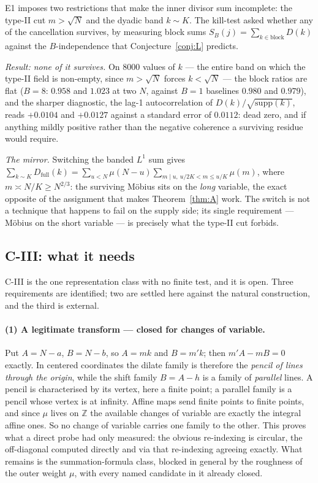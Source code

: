 \documentclass[11pt,a4paper]{article}
\theoremstyle{plain}
\theoremstyle{definition}
\begin{document}
E1 imposes two restrictions that make the inner divisor sum
incomplete: the type-II cut $m > \sqrt N$ and the dyadic band
$k \sim K$. The kill-test asked whether any of the cancellation
survives, by measuring block sums $S_B(j) = \sum_{k\in\text{block}}D(k)$
against the $B$-independence that Conjecture~\ref{conj:L} predicts.

\emph{Result: none of it survives.} On $8000$ values of $k$ --- the
entire band on which the type-II field is non-empty, since
$m > \sqrt N$ forces $k < \sqrt N$ --- the block ratios are flat
($B=8$: $0.958$ and $1.023$ at two $N$, against $B=1$ baselines
$0.980$ and $0.979$), and the sharper diagnostic, the lag-1
autocorrelation of $D(k)/\sqrt{\mathrm{supp}(k)}$, reads
$+0.0104$ and $+0.0127$ against a standard error of $0.0112$: dead
zero, and if anything mildly positive rather than the negative
coherence a surviving residue would require.

\emph{The mirror.} Switching the banded $L^1$ sum gives
$\sum_{k\sim K}D_{\text{full}}(k)
 = \sum_{u<N}\mu(N-u)\sum_{m\mid u,\ u/2K<m\le u/K}\mu(m)$, where
$m \asymp N/K \ge N^{2/3}$: the surviving M\"obius sits on the
\emph{long} variable, the exact opposite of the assignment that makes
Theorem~\ref{thm:A} work. The switch is not a technique that happens
to fail on the supply side; its single requirement --- M\"obius on the
short variable --- is precisely what the type-II cut forbids.

\subsection{C-III: what it needs}\label{sec:c3}

C-III is the one representation class with no finite test, and it is
open. Three requirements are identified; two are settled here against
the natural construction, and the third is external.

\paragraph{(1) A legitimate transform --- closed for changes of
variable.} Put $A = N-a$, $B = N-b$, so $A = mk$ and $B = m'k$; then
$m'A - mB = 0$ exactly. In centered coordinates the dilate family is
therefore the \emph{pencil of lines through the origin}, while the
shift family $B = A - h$ is a family of \emph{parallel} lines. A
pencil is characterised by its vertex, here a finite point; a parallel
family is a pencil whose vertex is at infinity. Affine maps send
finite points to finite points, and since $\mu$ lives on $\mathbb Z$
the available changes of variable are exactly the integral affine
ones. So no change of variable carries one family to the other. This
proves what a direct probe had only measured: the obvious re-indexing
is circular, the off-diagonal computed directly and via that
re-indexing agreeing exactly. What remains is the summation-formula
class, blocked in general by the roughness of the outer weight $\mu$,
with every named candidate in it already closed.
\end{document}
